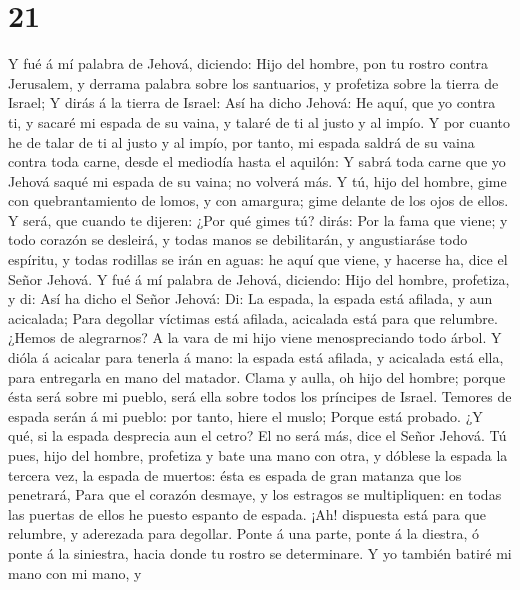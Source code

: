 \hypertarget{section-20}{%
\section{21}\label{section-20}}

 Y fué á mí palabra de Jehová, diciendo: 
Hijo del hombre, pon tu rostro contra Jerusalem, y derrama palabra sobre
los santuarios, y profetiza sobre la tierra de Israel;  Y
dirás á la tierra de Israel: Así ha dicho Jehová: He aquí, que yo contra
ti, y sacaré mi espada de su vaina, y talaré de ti al justo y al impío.
 Y por cuanto he de talar de ti al justo y al impío, por
tanto, mi espada saldrá de su vaina contra toda carne, desde el mediodía
hasta el aquilón:  Y sabrá toda carne que yo Jehová saqué
mi espada de su vaina; no volverá más.  Y tú, hijo del
hombre, gime con quebrantamiento de lomos, y con amargura; gime delante
de los ojos de ellos.  Y será, que cuando te dijeren: ¿Por
qué gimes tú? dirás: Por la fama que viene; y todo corazón se desleirá,
y todas manos se debilitarán, y angustiaráse todo espíritu, y todas
rodillas se irán en aguas: he aquí que viene, y hacerse ha, dice el
Señor Jehová.  Y fué á mí palabra de Jehová, diciendo:
 Hijo del hombre, profetiza, y di: Así ha dicho el Señor
Jehová: Di: La espada, la espada está afilada, y aun acicalada;
 Para degollar víctimas está afilada, acicalada está para
que relumbre. ¿Hemos de alegrarnos? A la vara de mi hijo viene
menospreciando todo árbol.  Y dióla á acicalar para
tenerla á mano: la espada está afilada, y acicalada está ella, para
entregarla en mano del matador.  Clama y aulla, oh hijo
del hombre; porque ésta será sobre mi pueblo, será ella sobre todos los
príncipes de Israel. Temores de espada serán á mi pueblo: por tanto,
hiere el muslo;  Porque está probado. ¿Y qué, si la
espada desprecia aun el cetro? El no será más, dice el Señor Jehová.
 Tú pues, hijo del hombre, profetiza y bate una mano con
otra, y dóblese la espada la tercera vez, la espada de muertos: ésta es
espada de gran matanza que los penetrará,  Para que el
corazón desmaye, y los estragos se multipliquen: en todas las puertas de
ellos he puesto espanto de espada. ¡Ah! dispuesta está para que
relumbre, y aderezada para degollar.  Ponte á una parte,
ponte á la diestra, ó ponte á la siniestra, hacia donde tu rostro se
determinare.  Y yo también batiré mi mano con mi mano, y
